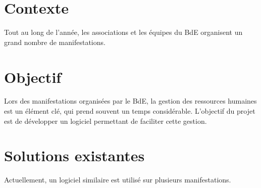 \section{Contexte}
Tout au long de l'année, les associations et les équipes du BdE organisent un grand nombre de manifestations.
\section{Objectif}
Lors des manifestations organisées par le BdE, la gestion des ressources humaines est un élément clé, qui prend souvent un temps considérable.
L'objectif du projet est de développer un logiciel permettant de faciliter cette gestion.
\section{Solutions existantes}
Actuellement, un logiciel similaire est utilisé sur plusieurs manifestations. 